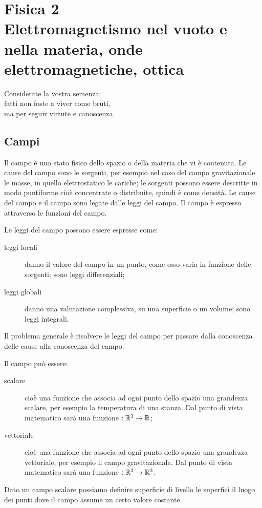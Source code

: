 \part[Fisica 2]{\texorpdfstring{Fisica 2\\\vspace{1cm}\large{Elettromagnetismo nel vuoto e nella materia, onde elettromagnetiche, ottica}}{Fisica 2}}

\begin{savequote}[6cm]
  Considerate la vostra semenza:\\
  fatti non foste a viver come bruti,\\
  ma per seguir virtute e canoscenza.
\end{savequote}



\chapter{Campi}
\minitoc
Il campo  è uno stato fisico dello spazio o della materia che vi è contenuta. Le cause del campo sono le sorgenti, per esempio nel caso del campo gravitazionale le masse, in quello elettrostatico le cariche; le sorgenti possono essere descritte in modo puntiforme cioè concentrate o distribuite, quindi è come densità. Le cause del campo e il campo sono legate dalle leggi del campo. Il campo è espresso attraverso le funzioni del campo.

Le leggi del campo possono essere espresse come:
\begin{description}
  \item[leggi locali] danno il valore del campo in un punto, come esso varia in funzione delle sorgenti; sono leggi differenziali;
  \item[leggi globali] danno una valutazione complessiva, su una superficie o un volume; sono leggi integrali.
\end{description}

Il problema generale è risolvere le leggi del campo per passare dalla conoscenza delle cause alla conoscenza del campo.

Il campo può essere:
\begin{description}
  \item[scalare] cioè una funzione che associa ad ogni punto dello spazio una grandezza scalare, per esempio la temperatura di una stanza. Dal punto di vista matematico sarà una funzione $:\mathbb{R}^3\to\mathbb{R}$;
  \item[vettoriale] cioè una funzione che associa ad ogni punto dello spazio una grandezza vettoriale, per esempio il campo gravitazionale. Dal punto di vista matematico sarà una funzione $:\mathbb{R}^3\to\mathbb{R}^3$.
\end{description}
Dato un campo scalare possiamo definire superficie di livello le superfici il luogo dei punti dove il campo assume un certo valore costante.

